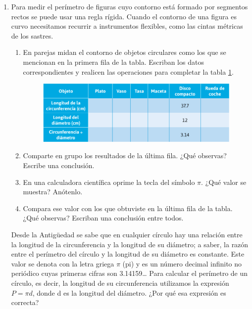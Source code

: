 \documentclass[11pt]{book}
\begin{document}
\begin{enumerate}
  \item Para medir el perímetro de figuras cuyo contorno está formado por segmentos
        rectos se puede usar una regla rígida. Cuando el contorno de una figura es
        curvo necesitamos recurrir a instrumentos flexibles, como las cintas métricas
        de los sastres.
        \begin{enumerate}
          \item En parejas midan el contorno de objetos circulares como los que se mencionan en
                la primera fila de la tabla. Escriban los datos correspondientes y realicen las
                operaciones para completar la tabla \ref{tab:tabla_rigidos}.\\

                \begin{figure}[H]
                  \centering
                  \includegraphics[width=.65\linewidth]{tabla_rigidos.png}
                  \label{tab:tabla_rigidos}
                \end{figure}

          \item Comparte en grupo los resultados de la última fila. ¿Qu\'e observas? Escribe una conclusión.
          \item En una calculadora científica oprime la tecla del símbolo $\pi$. ¿Qué valor se muestra? Anótenlo.
          \item Compara ese valor con los que obtuviste en la última fila de la tabla. ¿Qué observas?
                Escriban una conclusión entre todos.
        \end{enumerate}

        \begin{boxH}
          Desde la Antigüedad se sabe que en cualquier círculo hay una relación entre la longitud de la
          circunferencia y la longitud de su diámetro; a saber, la razón entre el perímetro del círculo y
          la longitud de su diámetro es constante.
          Este valor se denota con la letra griega $\pi$ (pi) y es un número decimal infinito no periódico
          cuyas primeras cifras son 3.14159\dots
          Para calcular el perímetro de un círculo, es decir, la longitud de su circunferencia utilizamos
          la expresión $P =\pi d$, donde d es la longitud del diámetro. ¿Por qué esa expresión es correcta?
        \end{boxH}


\end{enumerate}
\end{document}
